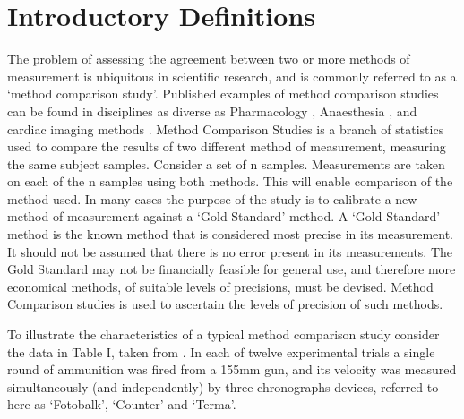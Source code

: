 \documentclass{report}
\begin{document}
\section{Introductory Definitions}




The problem of assessing the agreement between two or more methods of measurement is ubiquitous in scientific research, and is commonly referred to as a `method comparison study'. Published examples of method comparison studies can be found in disciplines
as diverse as Pharmacology \citep{ludbrook97}, Anaesthesia \citep{Myles}, and cardiac imaging methods \citep{Krumm}.
\smallskip
Method Comparison Studies is a branch of statistics used to compare the results of two different method of measurement, measuring the same subject samples. Consider a set of n samples. Measurements are taken on each of the n samples using both methods. This will enable comparison of the method used.
\smallskip
In many cases the purpose of the study is to calibrate a new method of measurement against a ‘Gold Standard’ method. A ‘Gold Standard’ method is the known method that is considered most precise in its measurement. It should not be assumed that there is no error present in its measurements.
\smallskip
The Gold Standard may not be financially feasible for general use, and therefore more economical methods, of suitable levels of precisions, must be devised. Method Comparison studies is used to ascertain the levels of precision of such methods.
\smallskip

To illustrate the characteristics of a typical method comparison study consider the data in Table I, taken from \citet{Grubbs73}.
\smallskip
In each of twelve experimental trials a single round of ammunition was fired from a 155mm gun, and its velocity was measured
simultaneously (and independently) by three chronographs devices, referred to here as `Fotobalk', `Counter' and `Terma'.
\smallskip


\newpage
\end{document}
